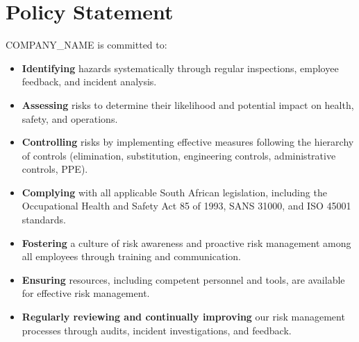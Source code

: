 \documentclass[12pt]{article}
\begin{document}
\section{Policy Statement}
{{COMPANY_NAME}} is committed to:
\begin{itemize}
    \item \textbf{Identifying} hazards systematically through regular inspections, employee feedback, and incident analysis.
    \item \textbf{Assessing} risks to determine their likelihood and potential impact on health, safety, and operations.
    \item \textbf{Controlling} risks by implementing effective measures following the hierarchy of controls (elimination, substitution, engineering controls, administrative controls, PPE).
    \item \textbf{Complying} with all applicable South African legislation, including the Occupational Health and Safety Act 85 of 1993, SANS 31000, and ISO 45001 standards.
    \item \textbf{Fostering} a culture of risk awareness and proactive risk management among all employees through training and communication.
    \item \textbf{Ensuring} resources, including competent personnel and tools, are available for effective risk management.
    \item \textbf{Regularly reviewing and continually improving} our risk management processes through audits, incident investigations, and feedback.
\end{itemize}
\end{document}

